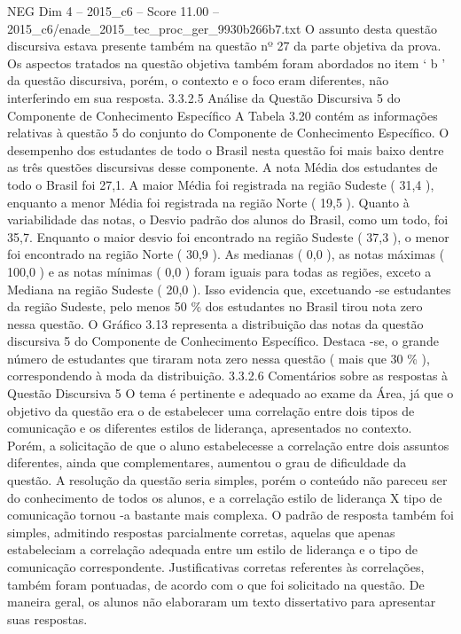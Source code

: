 \begin{textsample}{NEG Dim 4 – 2015\_c6 – Score 11.00 – 2015\_c6/enade\_2015\_tec\_proc\_ger\_9930b266b7.txt}
O assunto desta questão discursiva estava presente também na questão nº 27 da parte objetiva da prova.
Os aspectos tratados na questão objetiva também foram abordados no item ‘ b ’ da questão discursiva, porém, o contexto e o foco eram diferentes, não interferindo em sua resposta. 3.3.2.5 Análise da Questão Discursiva 5 do Componente de Conhecimento Específico A Tabela 3.20 contém as informações relativas à questão 5 do conjunto do Componente de Conhecimento Específico.
O desempenho dos estudantes de todo o Brasil nesta questão foi mais baixo dentre as três questões discursivas desse componente.
A nota Média dos estudantes de todo o Brasil foi 27,1.
A maior Média foi registrada na região Sudeste ( 31,4 ), enquanto a menor Média foi registrada na região Norte ( 19,5 ).
Quanto à variabilidade das notas, o Desvio padrão dos alunos do Brasil, como um todo, foi 35,7.
Enquanto o maior desvio foi encontrado na região Sudeste ( 37,3 ), o menor foi encontrado na região Norte ( 30,9 ).
As medianas ( 0,0 ), as notas máximas ( 100,0 ) e as notas mínimas ( 0,0 ) foram iguais para todas as regiões, exceto a Mediana na região Sudeste ( 20,0 ).
Isso evidencia que, excetuando -se estudantes da região Sudeste, pelo menos 50 \% dos estudantes no Brasil tirou nota zero nessa questão.
O Gráfico 3.13 representa a distribuição das notas da questão discursiva 5 do Componente de Conhecimento Específico.
Destaca -se, o grande número de estudantes que tiraram nota zero nessa questão ( mais que 30 \% ), correspondendo à moda da distribuição. 3.3.2.6 Comentários sobre as respostas à Questão Discursiva 5 O tema é pertinente e adequado ao exame da Área, já que o objetivo da questão era o de estabelecer uma correlação entre dois tipos de comunicação e os diferentes estilos de liderança, apresentados no contexto.
Porém, a solicitação de que o aluno estabelecesse a correlação entre dois assuntos diferentes, ainda que complementares, aumentou o grau de dificuldade da questão.
A resolução da questão seria simples, porém o conteúdo não pareceu ser do conhecimento de todos os alunos, e a correlação estilo de liderança X tipo de comunicação tornou -a bastante mais complexa.
O padrão de resposta também foi simples, admitindo respostas parcialmente corretas, aquelas que apenas estabeleciam a correlação adequada entre um estilo de liderança e o tipo de comunicação correspondente.
Justificativas corretas referentes às correlações, também foram pontuadas, de acordo com o que foi solicitado na questão.
De maneira geral, os alunos não elaboraram um texto dissertativo para apresentar suas respostas.

\end{textsample}
